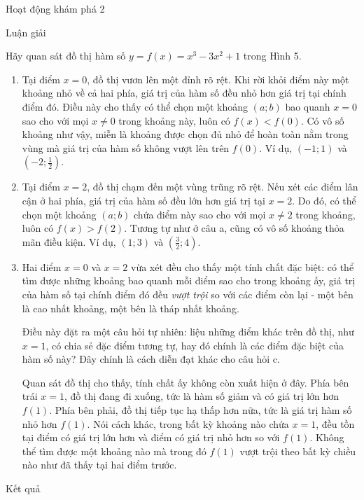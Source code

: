 \documentclass[
]{article}
\begin{document}
\begin{tcolorbox}
Hoạt động khám phá 2

Luận giải

Hãy quan sát đồ thị hàm số \(y = f(x) = x^3 - 3x^2 + 1\) trong Hình 5.

\begin{enumerate}
\def\labelenumi{\alph{enumi}.}
\item
  Tại điểm \(x = 0\), đồ thị vươn lên một đỉnh rõ rệt. Khi rời khỏi điểm
  này một khoảng nhỏ về cả hai phía, giá trị của hàm số đều nhỏ hơn giá
  trị tại chính điểm đó. Điều này cho thấy có thể chọn một khoảng
  \((a; b)\) bao quanh \(x = 0\) sao cho với mọi \(x \ne 0\) trong
  khoảng này, luôn có \(f(x) < f(0)\). Có vô số khoảng như vậy, miễn là
  khoảng được chọn đủ nhỏ để hoàn toàn nằm trong vùng mà giá trị của hàm
  số không vượt lên trên \(f(0)\). Ví dụ, \((-1;1)\) và
  \(\left(-2;\frac{1}{2}\right)\).
\item
  Tại điểm \(x = 2\), đồ thị chạm đến một vùng trũng rõ rệt. Nếu xét các
  điểm lân cận ở hai phía, giá trị của hàm số đều lớn hơn giá trị tại
  \(x = 2\). Do đó, có thể chọn một khoảng \((a; b)\) chứa điểm này sao
  cho với mọi \(x \ne 2\) trong khoảng, luôn có \(f(x) > f(2)\). Tương
  tự như ở câu a, cũng có vô số khoảng thỏa mãn điều kiện. Ví dụ,
  \((1;3)\) và \(\left(\frac{3}{2};4\right)\).
\item
  Hai điểm \(x=0\) và \(x=2\) vừa xét đều cho thấy một tính chất đặc
  biệt: có thể tìm được những khoảng bao quanh mỗi điểm sao cho trong
  khoảng ấy, giá trị của hàm số tại chính điểm đó đều \emph{vượt trội}
  so với các điểm còn lại - một bên là cao nhất khoảng, một bên là tháp
  nhất khoảng.

  Điều này đặt ra một câu hỏi tự nhiên: liệu những điểm khác trên đồ
  thị, như \(x=1\), có chia sẻ đặc điểm tương tự, hay đó chính là các
  điểm đặc biệt của hàm số này? Đây chính là cách diễn đạt khác cho câu
  hỏi c.

  Quan sát đồ thị cho thấy, tính chất ấy không còn xuất hiện ở đây. Phía
  bên trái \(x = 1\), đồ thị đang đi xuống, tức là hàm số giảm và có giá
  trị lớn hơn \(f(1)\). Phía bên phải, đồ thị tiếp tục hạ thấp hơn nữa,
  tức là giá trị hàm số nhỏ hơn \(f(1)\). Nói cách khác, trong bất kỳ
  khoảng nào chứa \(x = 1\), đều tồn tại điểm có giá trị lớn hơn và điểm
  có giá trị nhỏ hơn so với \(f(1)\). Không thể tìm được một khoảng nào
  mà trong đó \(f(1)\) vượt trội theo bất kỳ chiều nào như đã thấy tại
  hai điểm trước.
\end{enumerate}

Kết quả


\end{tcolorbox}
\end{document}
